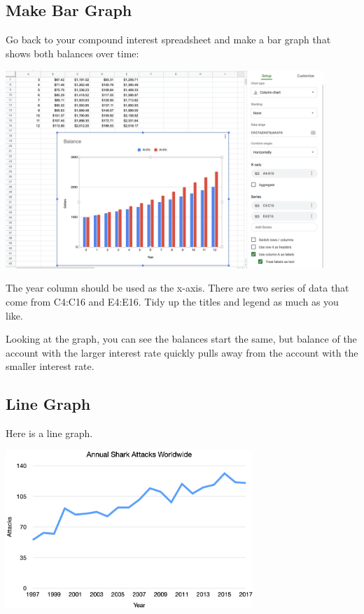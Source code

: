 \subsection{Make Bar Graph}

Go back to your compound interest spreadsheet and make a bar graph
that shows both balances over time:

\includegraphics[width=0.9\textwidth]{InterestGraph.png}

The year column should be used as the x-axis. There are two series of
data that come from C4:C16 and E4:E16.  Tidy up the titles and legend
as much as you like.

Looking at the graph, you can see the balances start the same, but
balance of the account with the larger interest rate quickly pulls
away from the account with the smaller interest rate.

\subsection{Line Graph}

Here is a line graph.

\includegraphics[width=0.7\textwidth]{SharksLine1.png}

